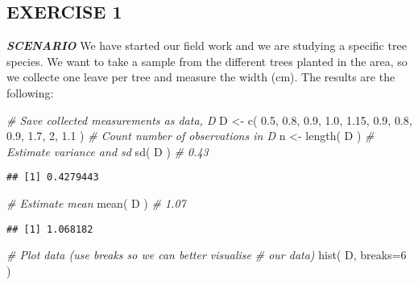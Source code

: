 \documentclass[
]{article}
\newenvironment{Shaded}{\begin{snugshade}}{\end{snugshade}}
\newcommand{\AttributeTok}[1]{\textcolor[rgb]{0.77,0.63,0.00}{#1}}
\newcommand{\CommentTok}[1]{\textcolor[rgb]{0.56,0.35,0.01}{\textit{#1}}}
\newcommand{\DecValTok}[1]{\textcolor[rgb]{0.00,0.00,0.81}{#1}}
\newcommand{\FloatTok}[1]{\textcolor[rgb]{0.00,0.00,0.81}{#1}}
\newcommand{\FunctionTok}[1]{\textcolor[rgb]{0.00,0.00,0.00}{#1}}
\newcommand{\NormalTok}[1]{#1}
\newcommand{\OtherTok}[1]{\textcolor[rgb]{0.56,0.35,0.01}{#1}}
\begin{document}
\hypertarget{exercise-1}{%
\subsection{EXERCISE 1}\label{exercise-1}}

\emph{\textbf{SCENARIO}} We have started our field work and we are
studying a specific tree species. We want to take a sample from the
different trees planted in the area, so we collecte one leave per tree
and measure the width (cm). The results are the following:

\begin{Shaded}
\begin{Highlighting}[]
\CommentTok{\# Save collected measurements as data, D}
\NormalTok{D }\OtherTok{\textless{}{-}} \FunctionTok{c}\NormalTok{( }\FloatTok{0.5}\NormalTok{, }\FloatTok{0.8}\NormalTok{, }\FloatTok{0.9}\NormalTok{, }\FloatTok{1.0}\NormalTok{, }\FloatTok{1.15}\NormalTok{, }\FloatTok{0.9}\NormalTok{, }\FloatTok{0.8}\NormalTok{, }\FloatTok{0.9}\NormalTok{, }\FloatTok{1.7}\NormalTok{, }\DecValTok{2}\NormalTok{, }\FloatTok{1.1}\NormalTok{ )}
\CommentTok{\# Count number of observations in D}
\NormalTok{n }\OtherTok{\textless{}{-}} \FunctionTok{length}\NormalTok{( D )}
\CommentTok{\# Estimate variance and sd }
\FunctionTok{sd}\NormalTok{( D ) }\CommentTok{\# 0.43}
\end{Highlighting}
\end{Shaded}

\begin{verbatim}
## [1] 0.4279443
\end{verbatim}

\begin{Shaded}
\begin{Highlighting}[]
\CommentTok{\# Estimate mean }
\FunctionTok{mean}\NormalTok{( D ) }\CommentTok{\# 1.07}
\end{Highlighting}
\end{Shaded}

\begin{verbatim}
## [1] 1.068182
\end{verbatim}

\begin{Shaded}
\begin{Highlighting}[]
\CommentTok{\# Plot data (use \textasciigrave{}breaks\textasciigrave{} so we can better visualise }
\CommentTok{\# our data)}
\FunctionTok{hist}\NormalTok{( D, }\AttributeTok{breaks=}\DecValTok{6}\NormalTok{ )}
\end{Highlighting}
\end{Shaded}
\end{document}
